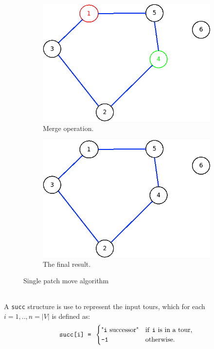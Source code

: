 \begin{figure}[!h]
\begin{subfigure}{.26\columnwidth}
		\includegraphics[width=\columnwidth]{img/patching5.png}
		\caption{Merge operation.}
		\label{fig:patching5}
	\end{subfigure}
\hfill%
	\begin{subfigure}{.26\columnwidth}
		\includegraphics[width=\columnwidth]{img/patching6.png}
		\caption{The final result.}
		\label{fig:patching6}
	\end{subfigure}
\caption{Single patch move algorithm}
\label{fig:single_patch}
\end{figure}\\
A \texttt{succ} structure is use to represent the input tours, which for each  $ i = 1, .., n = |V|$ is defined as: 
\begin{equation}
\texttt{succ[i] = } \begin{cases}
 \text{"\texttt{i} successor"} & \text{if \texttt{i} is in a tour,}\\
 \text{\texttt{-1}} & \text{otherwise.}
\end{cases}
\end{equation} \\
